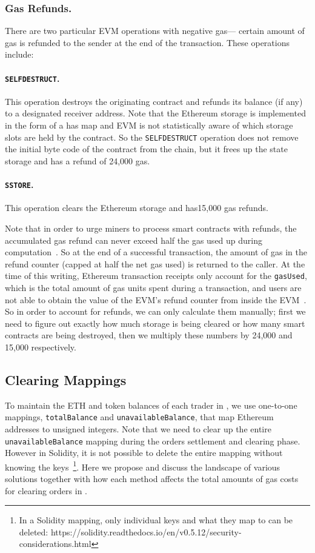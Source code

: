\subsubsection*{Gas Refunds.}There are two particular EVM operations with negative gas--- certain amount of gas is refunded to the sender at the end of the transaction. These operations include:

\paragraph{\texttt{SELFDESTRUCT}.}This operation destroys the originating contract and refunds its balance (if any) to a designated receiver address. Note that the Ethereum storage is implemented in the form of a has map and EVM is not statistically aware of which storage slots are held by the contract. So the \texttt{SELFDESTRUCT} operation does not remove the initial byte code of the contract from the chain, but it frees up the state storage and has a refund of 24,000 gas.

\paragraph{\texttt{SSTORE}.} This operation clears the Ethereum storage and has15,000 gas refunds. 

Note that in order to urge miners to process smart contracts with refunds, the accumulated gas refund can never exceed half the gas used up during computation~\cite{wood2014ethereum}. So at the end of a successful transaction, the amount of gas in the refund counter (capped at half the net gas used) is returned to the caller. At the time of this writing, Ethereum transaction receipts only account for the \texttt{gasUsed}, which is the total amount of gas units spent during a transaction, and users are not able to obtain the value of the EVM's refund counter from inside the EVM~\cite{signer2018gas}. So in order to account for refunds, we can only calculate them manually; first we need to figure out exactly how much storage is being cleared or how many smart contracts are being destroyed, then we multiply these numbers by 24,000 and 15,000 respectively. 


\subsection{Clearing Mappings}

To maintain the ETH and token balances of each trader in \cm, we use one-to-one mappings, \texttt{totalBalance} and \texttt{unavailableBalance}, that map Ethereum addresses to unsigned integers. Note that we need to clear up the entire  \texttt{unavailableBalance} mapping during the orders settlement and clearing phase. However in Solidity, it is not possible to delete the entire mapping without knowing the keys~\footnote{In a Solidity mapping, only individual keys and what they map to can be deleted: https://solidity.readthedocs.io/en/v0.5.12/security-considerations.html}. Here we propose and discuss the landscape of various solutions together with how each method affects the total amounts of gas costs for clearing orders in \cm.

